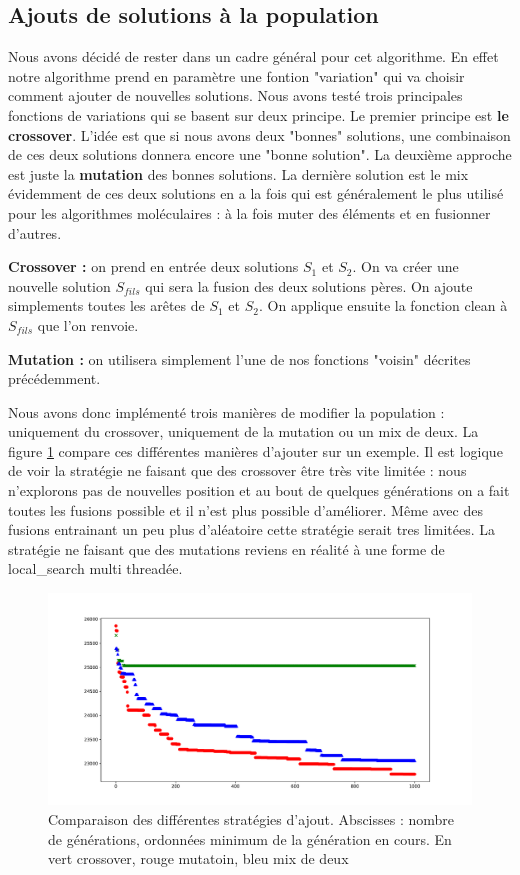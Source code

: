 \documentclass[10pt,a4paper]{article}
\begin{document}
\subsection{Ajouts de solutions à la population }

Nous avons décidé de rester dans un cadre général pour cet algorithme. En effet notre algorithme prend en paramètre une fontion "variation" qui va choisir comment ajouter de nouvelles solutions. Nous avons testé trois principales fonctions de variations qui se basent sur deux principe. Le premier principe est \textbf{le crossover}. L'idée est que si nous avons deux "bonnes" solutions, une combinaison de ces deux solutions donnera encore une "bonne solution". La deuxième approche est juste la \textbf{mutation} des bonnes solutions. La dernière solution est le mix évidemment de ces deux solutions en a la fois qui est généralement le plus utilisé pour les algorithmes moléculaires : à la fois muter des éléments et en fusionner d'autres.



\textbf{Crossover : } on prend en entrée deux solutions $S_1$ et $S_2$. On va créer une nouvelle solution $S_{fils}$ qui sera la fusion des deux solutions pères. On ajoute simplements toutes les arêtes de $S_1$ et $S_2$. On applique ensuite la fonction clean à $S_{fils}$ que l'on renvoie.

\textbf{Mutation : } on utilisera simplement l'une de nos fonctions "voisin" décrites précédemment.


Nous avons donc implémenté trois manières de modifier la population : uniquement du crossover, uniquement de la mutation ou un mix de deux. La figure \ref{compareajout} compare ces différentes manières d'ajouter sur un exemple. Il est logique de voir la stratégie ne faisant que des crossover être très vite limitée : nous n'explorons pas de nouvelles position et au bout de quelques générations on a fait toutes les fusions possible et il n'est plus possible d'améliorer. Même avec des fusions entrainant un peu plus d'aléatoire cette stratégie serait tres limitées. La stratégie ne faisant que des mutations reviens en réalité à une forme de local\_search multi threadée.
\begin{figure}
\centering
\includegraphics[scale=.4]{images/comparaison_genetic_ajout.pdf}
\caption{Comparaison des différentes stratégies d'ajout. Abscisses : nombre de générations, ordonnées minimum de la génération en cours. 
En vert crossover, rouge mutatoin, bleu mix de deux}
\label{compareajout}
\end{figure}
\end{document}
